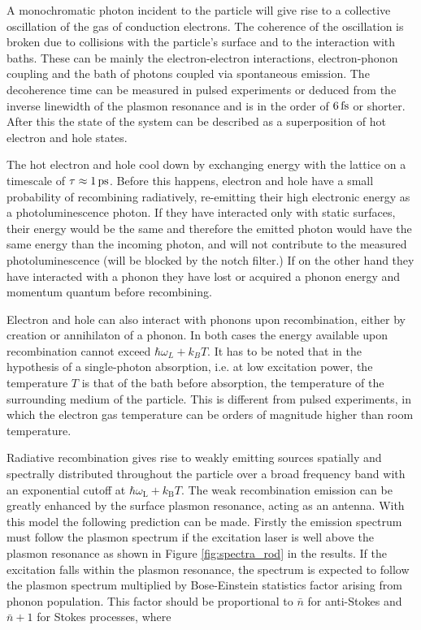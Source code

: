 A monochromatic photon incident to the particle will give rise to a collective
oscillation of the gas of conduction electrons. The coherence of the oscillation
is broken due to collisions with the particle's surface and to the interaction
with baths\cite{Zhao2016,Sonnichsen2002}. These can be mainly the
electron-electron interactions, electron-phonon coupling and the bath of photons
coupled via spontaneous emission. The decoherence time can be measured in pulsed
experiments or deduced from the inverse linewidth of the plasmon resonance and
is in the order of $6\,\textrm{fs}$ or shorter\cite{Sun1994}. After this the state of the
system can be described as a superposition of hot electron and hole states.

The hot electron and hole cool down by exchanging energy with the lattice on a
timescale of $\tau\approx1\,\textrm{ps}$\cite{Pustovalov2005}. Before this happens,
electron and hole have a small probability of recombining radiatively,
re-emitting their high electronic energy as a photoluminescence photon. If they
have interacted only with static surfaces, their energy would be the same and
therefore the emitted photon would have the same energy than the incoming
photon, and will not contribute to the measured photoluminescence (will be
blocked by the notch filter.) If on the other hand they have interacted with a
phonon they have lost or acquired a phonon energy and momentum quantum before
recombining.

Electron and hole can also interact with phonons upon recombination, either by
creation or annihilaton of a phonon. In both cases the energy available upon
recombination cannot exceed $\hbar\omega_L+k_BT$. It has to be noted that in the
hypothesis of a single-photon absorption, i.e. at low excitation power, the
temperature $T$ is that of the bath before absorption, the temperature of the
surrounding medium of the particle. This is different from pulsed experiments,
in which the electron gas temperature can be orders of magnitude higher than
room temperature\cite{Baffou2013a}. 

Radiative recombination gives rise to weakly emitting sources spatially and
spectrally distributed throughout the particle over a broad frequency band with
an exponential cutoff at $\hbar\omega_\textrm{L}+k_\textrm{B}T$. The weak
recombination emission can be greatly enhanced by the surface plasmon resonance,
acting as an antenna. With this model the following prediction can be made.
Firstly the emission spectrum must follow the plasmon spectrum if the excitation
laser is well above the plasmon resonance as shown in Figure
\ref{fig:spectra_rod} in the results. If the excitation falls within the
plasmon resonance, the spectrum is expected to follow the plasmon spectrum multiplied by
Bose-Einstein statistics factor arising from phonon population.
This factor should be proportional to $\bar{n}$ for anti-Stokes and $\bar{n}+1$
for Stokes processes, where

